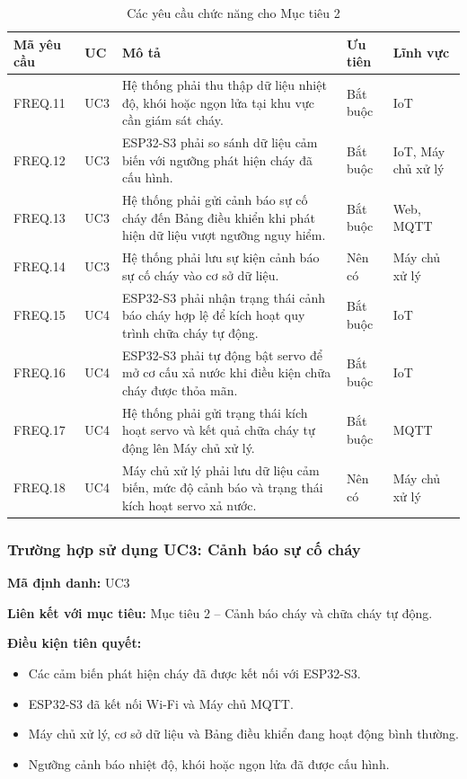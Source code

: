 \documentclass[a4paper,12pt]{article}
\begin{document}
\renewcommand{\arraystretch}{1.3}
\begin{table}[H]
\centering
\caption{Các yêu cầu chức năng cho Mục tiêu 2}
\small
\begin{tabularx}{\linewidth}{|p{1.8cm}|p{1.2cm}|X|p{2cm}|p{2.2cm}|}
\hline
\textbf{Mã yêu cầu} & \textbf{UC} & \textbf{Mô tả} & \textbf{Ưu tiên} & \textbf{Lĩnh vực} \\
\hline
FREQ.11 & UC3 & Hệ thống phải thu thập dữ liệu nhiệt độ, khói hoặc ngọn lửa tại khu vực cần giám sát cháy. & Bắt buộc & IoT \\
\hline
FREQ.12 & UC3 & ESP32-S3 phải so sánh dữ liệu cảm biến với ngưỡng phát hiện cháy đã cấu hình. & Bắt buộc & IoT, Máy chủ xử lý \\
\hline
FREQ.13 & UC3 & Hệ thống phải gửi cảnh báo sự cố cháy đến Bảng điều khiển khi phát hiện dữ liệu vượt ngưỡng nguy hiểm. & Bắt buộc & Web, MQTT \\
\hline
FREQ.14 & UC3 & Hệ thống phải lưu sự kiện cảnh báo sự cố cháy vào cơ sở dữ liệu. & Nên có & Máy chủ xử lý \\
\hline
FREQ.15 & UC4 & ESP32-S3 phải nhận trạng thái cảnh báo cháy hợp lệ để kích hoạt quy trình chữa cháy tự động. & Bắt buộc & IoT \\
\hline
FREQ.16 & UC4 & ESP32-S3 phải tự động bật servo để mở cơ cấu xả nước khi điều kiện chữa cháy được thỏa mãn. & Bắt buộc & IoT \\
\hline
FREQ.17 & UC4 & Hệ thống phải gửi trạng thái kích hoạt servo và kết quả chữa cháy tự động lên Máy chủ xử lý. & Bắt buộc & MQTT \\
\hline
FREQ.18 & UC4 & Máy chủ xử lý phải lưu dữ liệu cảm biến, mức độ cảnh báo và trạng thái kích hoạt servo xả nước. & Nên có & Máy chủ xử lý \\
\hline
\end{tabularx}
\end{table}

\subsubsection{Trường hợp sử dụng UC3: Cảnh báo sự cố cháy}

\textbf{Mã định danh:} UC3

\textbf{Liên kết với mục tiêu:} Mục tiêu 2 -- Cảnh báo cháy và chữa cháy tự động.

\textbf{Điều kiện tiên quyết:}
\begin{itemize}
    \item Các cảm biến phát hiện cháy đã được kết nối với ESP32-S3.
    \item ESP32-S3 đã kết nối Wi-Fi và Máy chủ MQTT.
    \item Máy chủ xử lý, cơ sở dữ liệu và Bảng điều khiển đang hoạt động bình thường.
    \item Ngưỡng cảnh báo nhiệt độ, khói hoặc ngọn lửa đã được cấu hình.
\end{itemize}
\end{document}

